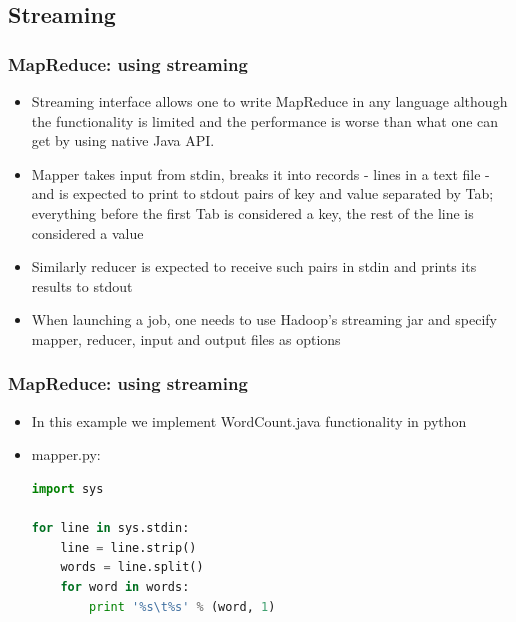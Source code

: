 \documentclass{beamer}
\begin{document}
  
\subsection{Streaming}
  \begin{frame}[fragile]
 \frametitle{MapReduce: using streaming}
 \begin{itemize}
 \item Streaming interface allows one to write MapReduce in any language although the functionality is limited and the performance is worse than what one can
 get by using native Java API. 
\item Mapper takes input from stdin, breaks it into records - lines in a text file - and is expected to print to stdout pairs of key and value separated by Tab;
  everything before the first Tab is considered a key, the rest of the line is considered a value
 \item Similarly reducer is expected to receive such pairs in stdin and prints its results to stdout
 \item When launching a job, one needs to use Hadoop's streaming jar and specify mapper, reducer, input and output files as options

 \end{itemize}
\end{frame}

  
\begin{frame}[fragile]
 \frametitle{MapReduce: using streaming}

 \begin{itemize}
   \item In this example we implement {\color{mycolorcli}WordCount.java} functionality in python
   \item {\color{mycolorcli}mapper.py}:
{\color{mycolorcode}
  \begin{lstlisting}[frame=single, basicstyle=\tiny,language=python]
import sys

for line in sys.stdin:
    line = line.strip()
    words = line.split()
    for word in words:
        print '%s\t%s' % (word, 1)

 \end{lstlisting} 
}
 \end{itemize}

\end{frame}
\end{document}
